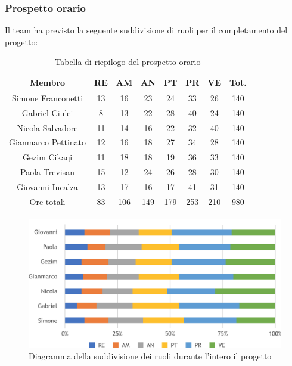 \subsubsection{Prospetto orario}
Il team ha previsto la seguente suddivisione di ruoli per il completamento del progetto:
\begin{table}[h]
\caption{Tabella di riepilogo del prospetto orario}  
\begin{center}
\begin{tabular}{ |c|c|c|c|c|c|c|c|  }
 \hline
 Membro 		& RE 		& AM 		& AN 	& PT 	& PR 	& VE 	& Tot.\\
 \hline\hline
 Simone	Franconetti		& 13 		& 16			& 23 		& 24 		& 33 		& 26 		& 140\\
 Gabriel Ciulei		& 8 			& 13 		& 22 		& 28		& 40 		& 24 		& 140\\
 Nicola	Salvadore		& 11 		& 14 		& 16 		& 22 		& 32 		& 40 		& 140\\
 Gianmarco Pettinato		& 12 		& 16 		& 18 		& 27	 	& 34 		& 28 		& 140\\
 Gezim Cikaqi		& 11 		& 18 		& 18 		& 19 		& 36 		& 33	 	& 140\\
 Paola Trevisan		& 15 		& 12 		& 24 		& 26 		& 28 		& 30 		& 140\\
 Giovanni	Incalza	& 13 		& 17	 		& 16 		& 17 		& 41	 	& 31  		& 140\\
 \hline\hline
 Ore totali		& 83 	& 106		& 149 	& 179 	& 253 	& 210 	& 980\\
  \hline
\end{tabular}
\end{center}
\end{table}
\begin{figure}[h!]
	\includegraphics[width=\textwidth]{res/img/hip3}
	\caption{Diagramma della suddivisione dei ruoli durante l'intero il progetto}
\end{figure}

